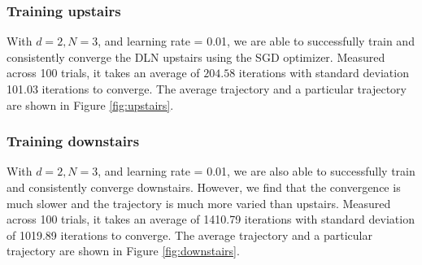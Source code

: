 \documentclass[11pt]{article}
\begin{document}
\subsubsection{Training upstairs}
With $d = 2, N = 3$, and learning rate = 0.01, we are able to successfully train and consistently converge the DLN upstairs using the SGD optimizer. Measured across 100 trials, it takes an average of $204.58$ iterations with standard deviation 101.03 iterations to converge. The average trajectory and a particular trajectory are shown in Figure \ref{fig:upstairs}.

\subsubsection{Training downstairs}
With $d = 2, N = 3$, and learning rate = 0.01, we are also able to successfully train and consistently converge downstairs. However, we find that the convergence is much slower and the trajectory is much more varied than upstairs. Measured across 100 trials, it takes an average of 1410.79 iterations with standard deviation of 1019.89 iterations to converge. The average trajectory and a particular trajectory are shown in Figure \ref{fig:downstairs}.
\end{document}
